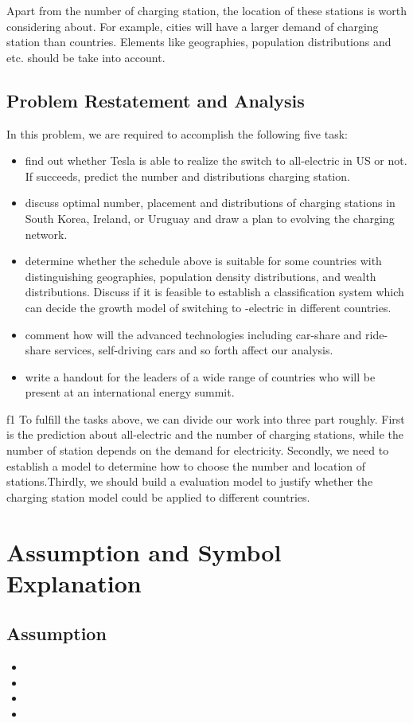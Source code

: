 \documentclass{mcmthesis}
\begin{document}
Apart from the number of charging station, the location of these stations is worth considering about. For example, cities will have a
larger demand of charging station than countries. Elements like geographies, population distributions and etc. should be take into account.

\subsection{Problem Restatement and Analysis}
 
In this problem, we are required to accomplish the following five task:
\begin{itemize}
\item find out whether Tesla is able to realize the switch to all-electric in US or not. If succeeds, predict the number and distributions
charging station.
\item discuss optimal number, placement and distributions of charging stations in South Korea, Ireland, or Uruguay and draw a plan to evolving
the charging network.
\item determine whether the schedule above is suitable for some countries with distinguishing geographies, population density distributions,
and wealth distributions. Discuss if it is feasible to establish a classification system which can decide the growth model of switching to
-electric in different countries.
\item comment how will the advanced technologies including car-share and ride-share services, self-driving cars and so forth affect our analysis.
\item write a handout for the leaders of a wide range of countries who will be present at an international energy summit.
\end{itemize}f1
To fulfill the tasks above, we can divide our work into three part roughly. First is the prediction about all-electric and the number of charging
stations, while the number of station depends on the demand for electricity. Secondly, we need to establish a model to determine how to choose the
number and location of stations.Thirdly, we should build a evaluation model to justify whether the charging station model could be applied to
different countries. 

\section{Assumption and Symbol Explanation}

\subsection{Assumption}
\begin{itemize}
  \item   
  \item 
  \item 
  \item 
\end{itemize}
\end{document}
